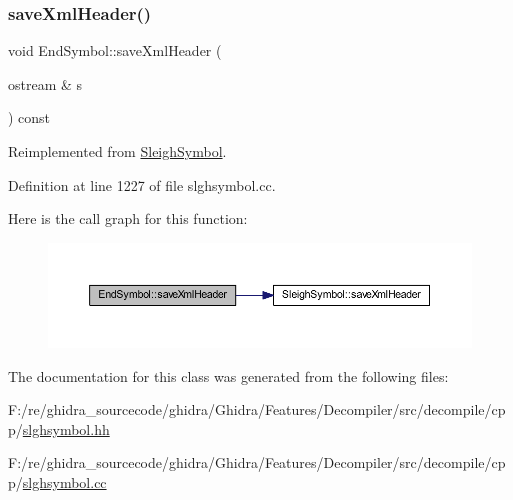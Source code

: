 \subsubsection{\texorpdfstring{saveXmlHeader()}{saveXmlHeader()}}
{\footnotesize\ttfamily void End\+Symbol\+::save\+Xml\+Header (\begin{DoxyParamCaption}\item[{ostream \&}]{s }\end{DoxyParamCaption}) const\hspace{0.3cm}{\ttfamily [virtual]}}



Reimplemented from \mbox{\hyperlink{class_sleigh_symbol_ac501be7c584bc0568c29fb95910962e9}{Sleigh\+Symbol}}.



Definition at line 1227 of file slghsymbol.\+cc.

Here is the call graph for this function\+:
\nopagebreak
\begin{figure}[H]
\begin{center}
\leavevmode
\includegraphics[width=350pt]{class_end_symbol_a78ad9229b9bab6735c31cd1fd0342729_cgraph}
\end{center}
\end{figure}


The documentation for this class was generated from the following files\+:\begin{DoxyCompactItemize}
\item 
F\+:/re/ghidra\+\_\+sourcecode/ghidra/\+Ghidra/\+Features/\+Decompiler/src/decompile/cpp/\mbox{\hyperlink{slghsymbol_8hh}{slghsymbol.\+hh}}\item 
F\+:/re/ghidra\+\_\+sourcecode/ghidra/\+Ghidra/\+Features/\+Decompiler/src/decompile/cpp/\mbox{\hyperlink{slghsymbol_8cc}{slghsymbol.\+cc}}\end{DoxyCompactItemize}
